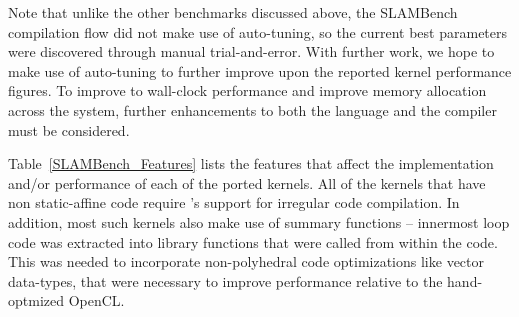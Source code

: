 \documentclass{llncs}
\begin{document}
Note that unlike the other benchmarks discussed above, the SLAMBench
\pencil compilation flow did not make use of auto-tuning, so the current
best \PPCG parameters were discovered through manual trial-and-error.
With further work, we hope to make use of auto-tuning to further improve
upon the reported kernel performance figures. To improve to wall-clock
performance and improve memory allocation across the system, further
enhancements to both the \pencil language and the \PPCG compiler must
be considered.

Table~\ref{SLAMBench_Features} lists the \pencil features that affect
the implementation and/or performance of each of the ported kernels.
All of the kernels that have non static-affine code require \PPCG's
support for irregular code compilation.
In addition, most such kernels also make use of summary
functions -- innermost loop code was extracted into library functions
that were called from within the \pencil code.
This was needed to incorporate non-polyhedral code optimizations like
vector data-types, that were necessary to improve performance relative
to the hand-optmized OpenCL.

\end{document}
